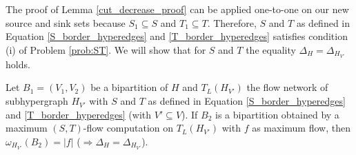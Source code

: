 The proof of Lemma \ref{cut_decrease_proof} can be applied one-to-one on our new source and
sink sets because $S_1 \subseteq S$ and $T_1 \subseteq T$. Therefore, $S$ and $T$ 
as defined in Equation \ref{S_border_hyperedges} and \ref{T_border_hyperedges} satisfies
condition (i) of Problem \ref{prob:ST}. We will show that for $S$ and $T$ 
the equality $\Delta_H = \Delta_{H_{V'}}$ holds.

\begin{theorem} 
\label{lemma:delta_proof}
Let $B_1 = (V_1,V_2)$ be a bipartition of $H$ and $T_L(H_{V'})$ the flow network of subhypergraph
$H_{V'}$ with $S$ and $T$ as defined in Equation \ref{S_border_hyperedges} and \ref{T_border_hyperedges} (with $V' \subseteq V$).
If $B_2$ is a bipartition obtained by a maximum $(S,T)$-flow computation on $T_L(H_{V'})$
with $f$ as maximum flow,
then $\omega_{H_{V'}}(B_2) = |f|$ ($\Rightarrow \Delta_H = \Delta_{H_{V'}}$).
\end{theorem}

